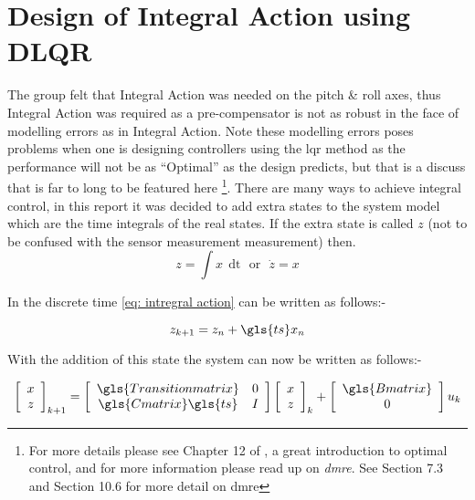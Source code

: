  \tocless\section{Design of Integral Action using DLQR}
The group felt that Integral Action was needed on the \gls{pitch} \& \gls{roll} axes, thus  Integral Action was required as a pre-compensator is not as robust in the face of modelling errors as in Integral Action. Note these modelling errors poses problems when one is designing controllers using the \gls{lqr} method as the performance will not be as \enquote{Optimal} as the design predicts, but that is a discuss that is far to long to be featured here \footnote{For more details please see Chapter 12 of \cite{Artofcontrol}, a great introduction to optimal control, and for more information please read up on \textit{\gls{dmre}}. See \cite{Discrete_control_systems} Section 7.3 and \cite{Digital_control_system_analysis_and_design} Section 10.6 for more detail on \gls{dmre}}. There are many ways to achieve integral control, in this report it was decided to add extra states to the system model which are the time integrals of the real states. If the extra state is called $z$ (not to be confused with the sensor measurement \gls{measurement}) then.
\begin{equation} 
z = \int x ~~\mathrm{dt}~~~\mathrm{or}~~~\dot{z} = x \label{eq: intregral action}
\end{equation}
 
 In the discrete time \eqref{eq: intregral action} can be written as follows:-
 
 \begin{equation}
 z_{k+1} = z_n  + \gls{ts}x_n 
 \end{equation}
 
 With the addition of this state the system can now be written as follows:-
 
 \begin{equation}
 \left[\begin{array}{c} x \\ z\end{array}\right]_{k+1} =  \left[\begin{array}{cc} \gls{Transitionmatrix} & 0\\ \gls{Cmatrix}\gls{ts} & I\end{array}\right]  \left[\begin{array}{c} x\\ z\end{array}\right]_{k} +  \left[\begin{array}{c} \gls{Bmatrix}\\ 0 \end{array}\right] u_k \label{eq: system with intergral action}
 \end{equation}
 
